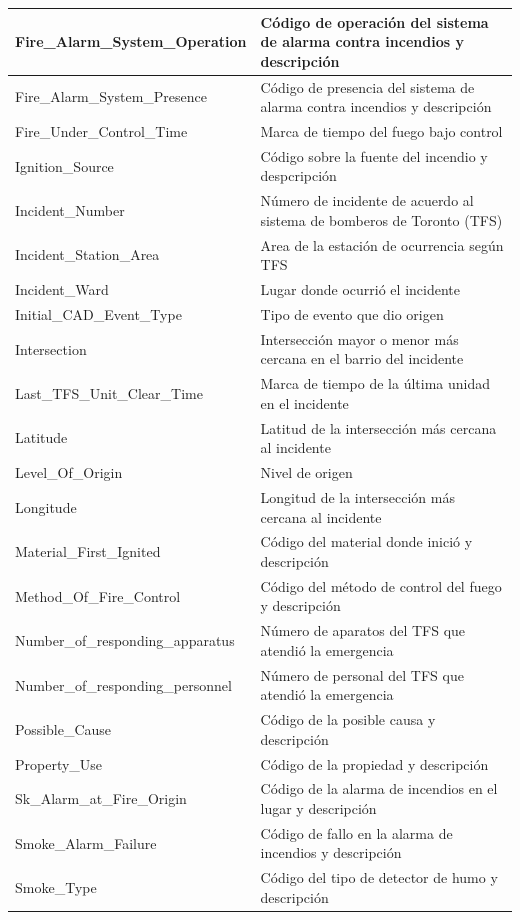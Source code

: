 \documentclass[
  oneside]{memoir}
\begin{document}
\begin{longtable}[t]{l|>{\raggedright\arraybackslash}p{7cm}}
\hline
Fire\_Alarm\_System\_Operation & Código de operación del sistema de alarma contra incendios y descripción\\
\hline
Fire\_Alarm\_System\_Presence & Código de presencia del sistema de alarma contra incendios y descripción\\
\hline
Fire\_Under\_Control\_Time & Marca de tiempo del fuego bajo control\\
\hline
Ignition\_Source & Código sobre la fuente del incendio y despcripción\\
\hline
Incident\_Number & Número de incidente de acuerdo al sistema de bomberos de Toronto (TFS)\\
\hline
Incident\_Station\_Area & Area de la estación de ocurrencia según TFS\\
\hline
Incident\_Ward & Lugar donde ocurrió el incidente\\
\hline
Initial\_CAD\_Event\_Type & Tipo de evento que dio origen\\
\hline
Intersection & Intersección mayor o menor más cercana en el barrio del incidente\\
\hline
Last\_TFS\_Unit\_Clear\_Time & Marca de tiempo de la última unidad en el incidente\\
\hline
Latitude & Latitud de la intersección más cercana al incidente\\
\hline
Level\_Of\_Origin & Nivel de origen\\
\hline
Longitude & Longitud de la intersección más cercana al incidente\\
\hline
Material\_First\_Ignited & Código del material donde inició y descripción\\
\hline
Method\_Of\_Fire\_Control & Código del método de control del fuego y descripción\\
\hline
Number\_of\_responding\_apparatus & Número de aparatos del TFS que atendió la emergencia\\
\hline
Number\_of\_responding\_personnel & Número de personal del TFS que atendió la emergencia\\
\hline
Possible\_Cause & Código de la posible causa y descripción\\
\hline
Property\_Use & Código de la propiedad y descripción\\
\hline
Sk\_Alarm\_at\_Fire\_Origin & Código de la alarma de incendios en el lugar y descripción\\
\hline
Smoke\_Alarm\_Failure & Código de fallo en la alarma de incendios y descripción\\
\hline
Smoke\_Type & Código del tipo de detector de humo y descripción\\

\end{longtable}
\end{document}
